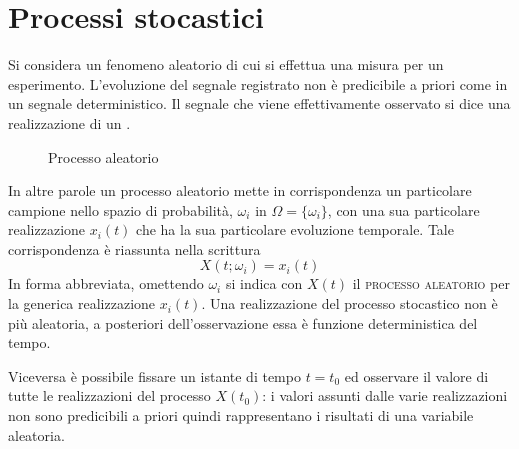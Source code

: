 \chapter{Processi stocastici}
Si considera un fenomeno aleatorio di cui si effettua una misura per un esperimento. L'evoluzione del segnale registrato non è predicibile a priori come in un segnale deterministico. Il segnale che viene effettivamente osservato si dice una realizzazione di un .

\begin{figure}[h!]
\caption{Processo aleatorio}
\end{figure}

In altre parole un processo aleatorio mette in corrispondenza un particolare campione nello spazio di probabilità, $\omega_i$ in $\Omega=\{\omega_i\}$, con una sua particolare realizzazione $x_i(t)$ che ha la sua particolare evoluzione temporale. Tale corrispondenza è riassunta nella scrittura
\begin{equation}X(t;\omega_i)=x_i(t)\end{equation}
In forma abbreviata, omettendo $\omega_i$ si indica con $X(t)$ il \textsc{processo aleatorio} per la generica realizzazione $x_i(t)$.
Una realizzazione del processo stocastico non è più aleatoria, a posteriori dell'osservazione essa è funzione deterministica del tempo.

Viceversa è possibile fissare un istante di tempo $t=t_0$ ed osservare il valore di tutte le realizzazioni del processo $X(t_0)$: i valori assunti dalle varie realizzazioni non sono predicibili a priori quindi rappresentano i risultati di una variabile aleatoria.

